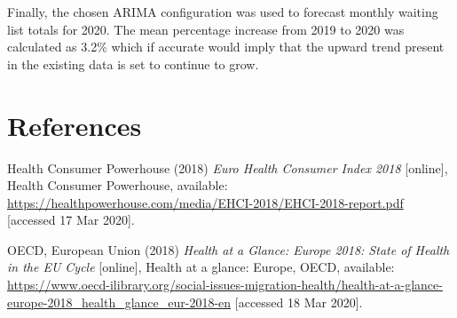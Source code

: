 \documentclass[
  12pt,
]{article}
\newlength{\cslhangindent}
\newenvironment{cslreferences}%
  {\setlength{\parindent}{0pt}%
  \everypar{\setlength{\hangindent}{\cslhangindent}}\ignorespaces}%
  {\par}
\begin{document}
Finally, the chosen ARIMA configuration was used to forecast monthly waiting list totals for 2020. The mean percentage increase from 2019 to 2020 was calculated as 3.2\% which if accurate would imply that the upward trend present in the existing data is set to continue to grow.

\hypertarget{references}{%
\section{References}\label{references}}

\hypertarget{refs}{}
\begin{cslreferences}
\leavevmode\hypertarget{ref-health_consumer_powerhouse_euro_2018}{}%
Health Consumer Powerhouse (2018) \emph{Euro Health Consumer Index 2018} {[}online{]}, Health Consumer Powerhouse, available: \url{https://healthpowerhouse.com/media/EHCI-2018/EHCI-2018-report.pdf} {[}accessed 17 Mar 2020{]}.

\leavevmode\hypertarget{ref-oecd_health_2018}{}%
OECD, European Union (2018) \emph{Health at a Glance: Europe 2018: State of Health in the EU Cycle} {[}online{]}, Health at a glance: Europe, OECD, available: \url{https://www.oecd-ilibrary.org/social-issues-migration-health/health-at-a-glance-europe-2018_health_glance_eur-2018-en} {[}accessed 18 Mar 2020{]}.
\end{cslreferences}
\end{document}
